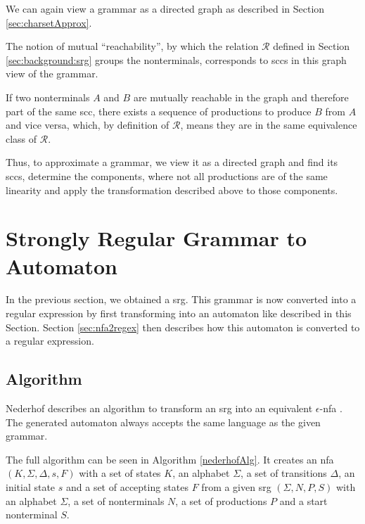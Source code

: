We can again view a grammar as a directed graph as described in Section \ref{sec:charsetApprox}.

The notion of mutual \enquote{reachability}, by which the relation $\mathcal{R}$ defined in Section \ref{sec:background:srg} groups the nonterminals, corresponds to \acp{scc} in this graph view of the grammar.

If two nonterminals $A$ and $B$ are mutually reachable in the graph and therefore part of the same \ac{scc}, there exists a sequence of productions to produce $B$ from $A$ and vice versa, which, by definition of $\mathcal{R}$, means they are in the same equivalence class of $\mathcal{R}$.

Thus, to approximate a grammar, we view it as a directed graph and find its \acp{scc}, determine the components, where not all productions are of the same linearity and apply the transformation described above to those components.

\begin{comment}

	
	Since a \ac{srg} generates a regular language and both steps in the transformation to a regular expression create an equivalent output from their input, the resulting regular expression accepts the language generated by the original \ac{srg}.
\end{comment}


\section{Strongly Regular Grammar to Automaton}\label{sec:nederhofAlgorithm}

In the previous section, we obtained a \acl{srg}. This grammar is now converted into a regular expression by first transforming into an automaton like described in this Section. Section \ref{sec:nfa2regex} then describes how this automaton is converted to a regular expression.

\subsection{Algorithm}

Nederhof describes an algorithm to transform an \ac{srg} into an equivalent $\epsilon$-\ac{nfa} \cite{nederhof}. The generated automaton always accepts the same language as the given grammar.

The full algorithm can be seen in Algorithm \ref{nederhofAlg}. It creates an \ac{nfa} $(K,\Sigma, \Delta, s, F)$ with a set of states $K$, an alphabet $\Sigma$, a set of transitions $\Delta$, an initial state $s$ and a set of accepting states $F$ from a given \ac{srg} $(\Sigma, N, P, S)$ with an alphabet $\Sigma$, a set of nonterminals $N$,  a set of productions $P$ and a start nonterminal $S$.

